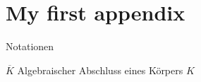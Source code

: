 \chapter{My first appendix}\label{sec:appendix1}

\lipsum[1]



Notationen

$\overline{K}$ Algebraischer Abschluss eines Körpers $K$

